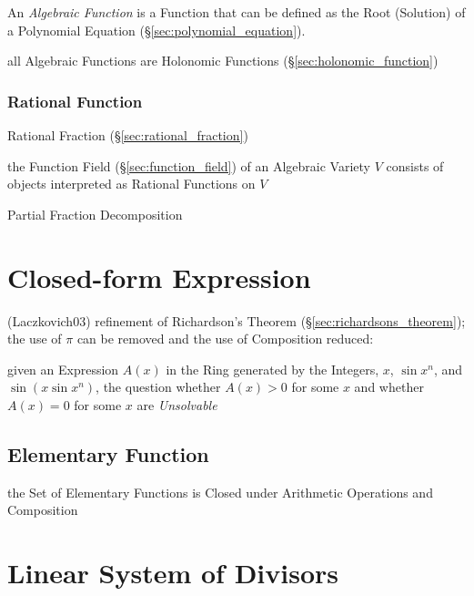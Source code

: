 An \emph{Algebraic Function} is a Function that can be defined as the Root
(Solution) of a Polynomial Equation (\S\ref{sec:polynomial_equation}).

all Algebraic Functions are Holonomic Functions (\S\ref{sec:holonomic_function})



\subsubsection{Rational Function}\label{sec:rational_function}

Rational Fraction (\S\ref{sec:rational_fraction})

the Function Field (\S\ref{sec:function_field}) of an Algebraic Variety $V$
consists of objects interpreted as Rational Functions on $V$

Partial Fraction Decomposition



\section{Closed-form Expression}\label{sec:closed_form_expression}

(Laczkovich03) refinement of Richardson's Theorem
(\S\ref{sec:richardsons_theorem}); the use of $\pi$ can be removed and the use
of Composition reduced:

given an Expression $A(x)$ in the Ring generated by the Integers, $x$, $\sin
x^n$, and $\sin(x \sin x^n)$, the question whether $A(x) > 0$ for some $x$ and
whether $A(x) = 0$ for some $x$ are \emph{Unsolvable}



\subsection{Elementary Function}\label{sec:elementary_function}

the Set of Elementary Functions is Closed under Arithmetic Operations and
Composition



\section{Linear System of Divisors}\label{sec:linear_system_of_divisors}

